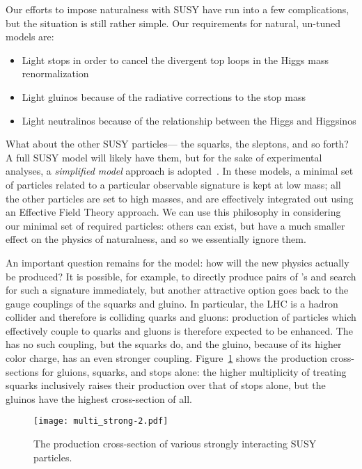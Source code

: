 Our efforts to impose naturalness with SUSY have run into a few complications, but the situation is still rather simple. Our requirements for natural, un-tuned models are:
%
\begin{itemize}
\item Light stops in order to cancel the divergent top loops in the Higgs mass renormalization
\item Light gluinos because of the radiative corrections to the stop mass
\item Light neutralinos because of the relationship between the Higgs and Higgsinos
\end{itemize}
%
What about the other SUSY particles--- the squarks, the sleptons, and so forth? A full SUSY model will likely have them, but for the sake of experimental analyses, a \textit{simplified model} approach is adopted~\cite{simplified}. In these models, a minimal set of particles related to a particular observable signature is kept at low mass; all the other particles are set to high masses, and are effectively integrated out using an Effective Field Theory approach. We can use this philosophy in considering our minimal set of required particles: others can exist, but have a much smaller effect on the physics of naturalness, and so we essentially ignore them.


An important question remains for the model: how will the new physics actually be produced? It is possible, for example, to directly produce pairs of \lsp's and search for such a signature immediately, but another attractive option goes back to the gauge couplings of the squarks and gluino. In particular, the LHC is a hadron collider and therefore is colliding quarks and gluons: production of particles which effectively couple to quarks and gluons is therefore expected to be enhanced. The \lsp has no such coupling, but the squarks do, and the gluino, because of its higher color charge, has an even stronger coupling. Figure~\ref{fig:susy:multi_strong} shows the production cross-sections for gluions, squarks, and stops alone: the higher multiplicity of treating squarks inclusively raises their production over that of stops alone, but the gluinos have the highest cross-section of all. 


\begin{figure}
\centering
\texttt{[image: multi\_strong-2.pdf]}
\label{fig:susy:multi_strong}
\caption{The production cross-section of various strongly interacting SUSY particles. }
\end{figure}


